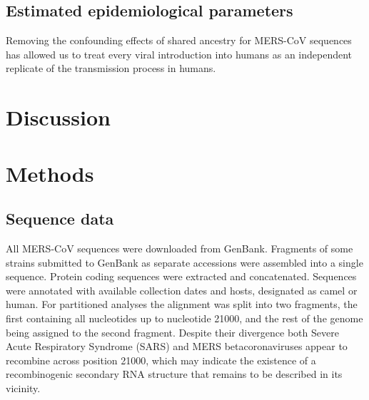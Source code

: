 \documentclass[11pt,oneside,letterpaper]{article}
\begin{document}
\subsection*{Estimated epidemiological parameters}
Removing the confounding effects of shared ancestry for MERS-CoV sequences has allowed us to treat every viral introduction into humans as an independent replicate of the transmission process in humans.


\section*{Discussion}

\subsection*{}

\newpage

\section*{Methods}
\subsection*{Sequence data}
All MERS-CoV sequences were downloaded from GenBank.
Fragments of some strains submitted to GenBank as separate accessions were assembled into a single sequence.
Protein coding sequences were extracted and concatenated.
Sequences were annotated with available collection dates and hosts, designated as camel or human.
For partitioned analyses the alignment was split into two fragments, the first containing all nucleotides up to nucleotide 21000, and the rest of the genome being assigned to the second fragment.
Despite their divergence both Severe Acute Respiratory Syndrome (SARS) and MERS betacoronaviruses appear to recombine across position 21000, which may indicate the existence of a recombinogenic secondary RNA structure that remains to be described in its vicinity. %
\end{document}
